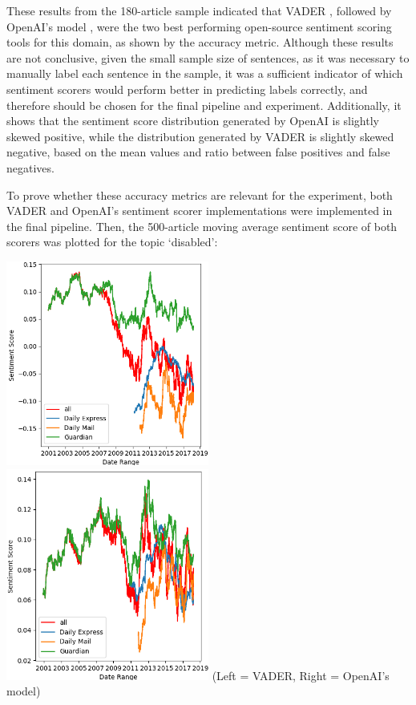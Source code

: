 \documentclass{report}
\begin{document}
These results from the 180-article sample indicated that VADER \cite{VADER}, followed by OpenAI's model \cite{OpenAI}, were the two best performing open-source sentiment scoring tools for this domain, as shown by the accuracy metric.
Although these results are not conclusive, given the small sample size of sentences, as it was necessary to manually label each sentence in the sample, it was a sufficient indicator of which sentiment scorers would perform better in predicting labels correctly, and therefore should be chosen for the final pipeline and experiment.
Additionally, it shows that the sentiment score distribution generated by OpenAI is slightly skewed positive, while the distribution generated by VADER is slightly skewed negative, based on the mean values and ratio between false positives and false negatives.

To prove whether these accuracy metrics are relevant for the experiment, both VADER and OpenAI's sentiment scorer implementations were implemented in the final pipeline.
Then, the 500-article moving average sentiment score of both scorers was plotted for the topic `disabled':

\noindent
\includegraphics[width=0.5\textwidth]{vader.png}
\includegraphics[width=0.5\textwidth]{openai.png}
(Left = VADER, Right = OpenAI's model)
\vspace{0.5em}
\end{document}
